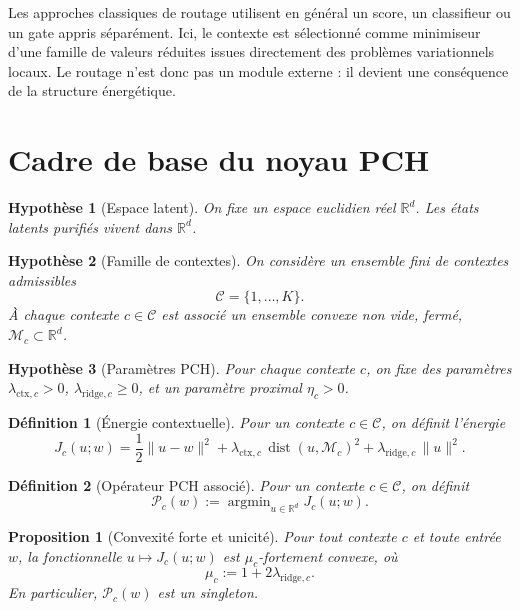 \documentclass[11pt,a4paper]{article}
\newtheorem{definition}{Définition}[section]
\newtheorem{assumption}{Hypothèse}[section]
\newtheorem{proposition}{Proposition}[section]
\DeclareMathOperator{\argmin}{argmin}
\DeclareMathOperator{\dist}{dist}
\newcommand{\R}{\mathbb R}
\newcommand{\Mcal}{\mathcal M}
\newcommand{\Ccal}{\mathcal C}
\newcommand{\Pcal}{\mathcal P}
\begin{document}
Les approches classiques de routage utilisent en général un score, un classifieur ou un gate appris séparément. Ici, le contexte est sélectionné comme minimiseur d'une famille de valeurs réduites issues directement des problèmes variationnels locaux. Le routage n'est donc pas un module externe : il devient une conséquence de la structure énergétique.

\section{Cadre de base du noyau PCH}

\begin{assumption}[Espace latent]
On fixe un espace euclidien réel \(\R^d\). Les états latents purifiés vivent dans \(\R^d\).
\end{assumption}

\begin{assumption}[Famille de contextes]
On considère un ensemble fini de contextes admissibles
\[
\Ccal = \{1,\dots,K\}.
\]
À chaque contexte \(c\in\Ccal\) est associé un ensemble convexe non vide, fermé, \(\Mcal_c\subset\R^d\).
\end{assumption}

\begin{assumption}[Paramètres PCH]
Pour chaque contexte \(c\), on fixe des paramètres \(\lambda_{\mathrm{ctx},c}>0\), \(\lambda_{\mathrm{ridge},c}\ge 0\), et un paramètre proximal \(\eta_c>0\).
\end{assumption}

\begin{definition}[Énergie contextuelle]
Pour un contexte \(c\in\Ccal\), on définit l'énergie
\[
J_c(u;w)
=
\frac12\|u-w\|^2
+
\lambda_{\mathrm{ctx},c}\,\dist(u,\Mcal_c)^2
+
\lambda_{\mathrm{ridge},c}\,\|u\|^2.
\]
\end{definition}

\begin{definition}[Opérateur PCH associé]
Pour un contexte \(c\in\Ccal\), on définit
\[
\Pcal_c(w)
:=
\argmin_{u\in\R^d} J_c(u;w).
\]
\end{definition}

\begin{proposition}[Convexité forte et unicité]
Pour tout contexte \(c\) et toute entrée \(w\), la fonctionnelle \(u\mapsto J_c(u;w)\) est \(\mu_c\)-fortement convexe, où
\[
\mu_c:=1+2\lambda_{\mathrm{ridge},c}.
\]
En particulier, \(\Pcal_c(w)\) est un singleton.
\end{proposition}
\end{document}
